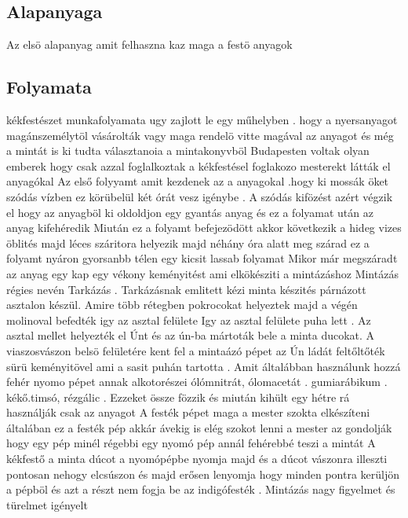 \documentclass[fontsize=12pt, appendixprefix=true]{scrreprt}
\begin{document}
 






\subsection{Alapanyaga}
Az elsö alapanyag amit felhaszna kaz maga a festö anyagok 



\subsection{Folyamata}
kékfestészet  munkafolyamata ugy zajlott le egy műhelyben . hogy a nyersanyagot magánszemélytöl vásárolták vagy maga rendelö vitte magával az anyagot és még a mintát is ki tudta választanoia  a mintakonyvböl
Budapesten voltak olyan emberek hogy csak azzal foglalkoztak a kékfestésel foglakozo mesterekt látták el anyagókal
Az első  folyyamt amit kezdenek az a anyagokal .hogy ki mossák öket szódás vízben ez körübelül két órát vesz igénybe .
 A szódás kifözést azért végzik el hogy az anyagböl ki oldoldjon egy gyantás anyag és ez a folyamat után  az anyag kifehéredik
 Miután ez a folyamt befejezödött akkor következik a hideg vizes öblités majd léces száritora helyezik majd néhány óra alatt meg szárad ez a folyamt nyáron gyorsanbb télen egy kicsit lassab folyamat 
Mikor már megszáradt az anyag egy kap egy vékony keményitést ami elkökésziti a mintázáshoz 
Mintázás régies nevén Tarkázás .
Tarkázásnak emlitett kézi minta készités  párnázott asztalon készül.
Amire több rétegben pokrocokat helyeztek majd a végén molinoval befedték igy az asztal felülete 
Igy az asztal felülete puha lett .
Az asztal mellet helyezték el Únt és az ún-ba mártoták bele a minta ducokat.
A viaszosvászon belsö felületére kent fel a mintaázó pépet az Ún 
ládát feltőltőték sürü keményitövel ami a sasit puhán tartotta .
Amit általábban használunk hozzá  fehér nyomo pépet annak alkotorészei ólómnitrát, ólomacetát . gumiarábikum . kékő.timsó, rézgálic .
Ezzeket össze fözzik és miután kihült egy hétre rá használják csak az anyagot 
A festék pépet  maga a mester szokta elkészíteni általában ez a festék pép akkár ávekig is elég szokot lenni a mester az gondolják hogy egy pép minél régebbi egy nyomó pép annál fehérebbé teszi a mintát
A kékfestő a minta  dúcot a nyomópépbe nyomja majd és a dúcot vászonra illeszti pontosan nehogy elcsúszon és majd erősen lenyomja hogy minden pontra kerüljön a pépböl és azt a részt nem fogja be az indigófesték .
Mintázás nagy figyelmet és türelmet igényelt 
\end{document}
